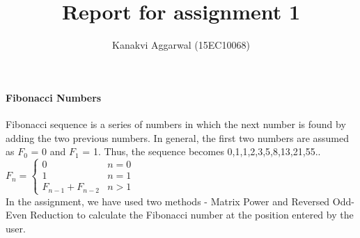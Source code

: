 \documentclass[a4paper,12pt]{article}
\title{Report for assignment 1}
\author{Kanakvi Aggarwal (15EC10068)}
\begin{document}
\maketitle

\paragraph{Fibonacci Numbers}

\par Fibonacci sequence is a series of numbers in which the next number is found by adding the two previous numbers. In general, the first two numbers are assumed as $F_0$ = 0 and $F_1$ = 1. Thus, the sequence becomes 0,1,1,2,3,5,8,13,21,55..\linebreak
$F_n=\left\{\begin{array}{ll}0&n=0\\1&n=1\\F_{n-1}+F_{n-2}&n>1\end{array}\right.$ 
\\In the assignment, we have used two methods - Matrix Power and Reversed Odd-Even Reduction to calculate the Fibonacci number at the position entered by the user. 
    
\end{document}
